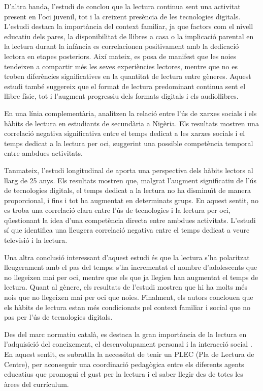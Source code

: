 \documentclass[12pt]{article}
\begin{document}
D'altra banda, l’estudi de \textcite{shutaleva} conclou que la lectura continua sent una activitat present en l’oci juvenil, tot i la creixent presència de les tecnologies digitals. L’estudi destaca la importància del context familiar, ja que factors com el nivell educatiu dels pares, la disponibilitat de llibres a casa o la implicació parental en la lectura durant la infància es correlacionen positivament amb la dedicació lectora en etapes posteriors. Així mateix, es posa de manifest que les noies tendeixen a compartir més les seves experiències lectores, mentre que no es troben diferències significatives en la quantitat de lectura entre gèneres. Aquest estudi també suggereix que el format de lectura predominant continua sent el llibre físic, tot i l’augment progressiu dels formats digitals i els audiollibres.

En una línia complementària,  analitzen la relació entre l’ús de xarxes socials i els hàbits de lectura en estudiants de secundària a Nigèria. Els resultats mostren una correlació negativa significativa entre el temps dedicat a les xarxes socials i el temps dedicat a la lectura per oci, suggerint una possible competència temporal entre ambdues activitats.

Tanmateix, l’estudi longitudinal de \textcite{johnsson_bookreading} aporta una perspectiva dels hàbits lectors al llarg de 25 anys. Els resultats mostren que, malgrat l’augment significatiu de l’ús de tecnologies digitals, el temps dedicat a la lectura no ha disminuït de manera proporcional, i fins i tot ha augmentat en determinats grups. En aquest sentit, no es troba una correlació clara entre l’ús de tecnologies i la lectura per oci, qüestionant la idea d’una competència directa entre ambdues activitats. L’estudi sí que identifica una lleugera correlació negativa entre el temps dedicat a veure televisió i la lectura.

Una altra conclusió interessant d'aquest estudi és que la lectura s'ha polaritzat lleugerament amb el pas del temps: s'ha incrementat el nombre d'adolescents que no llegeixen mai per oci, mentre que els que ja llegien han augmentat el temps de lectura. Quant al gènere, els resultats de l'estudi mostren que hi ha molts més nois que no llegeixen mai per oci que noies. Finalment, els autors conclouen que els hàbits de lectura estan més condicionats pel context familiar i social que no pas per l’ús de tecnologies digitals.

Des del marc normatiu català, es destaca la gran importància de la lectura en l'adquisició del coneixement, el desenvolupament personal i la interacció social \parencite{generalitatPLEC}. En aquest sentit, es subratlla la necessitat de tenir un PLEC (Pla de Lectura de Centre), per aconseguir una coordinació pedagògica entre els diferents agents educatius que promogui el gust per la lectura i el saber llegir des de totes les àrees del currículum.
\end{document}
